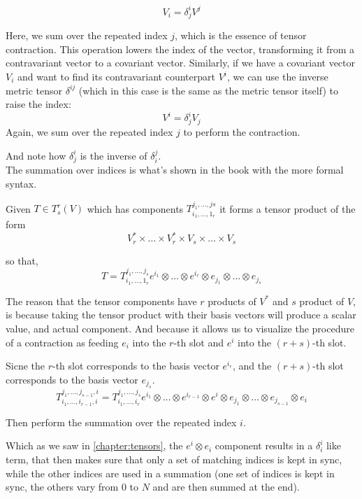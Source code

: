 $$
V_i = \delta^i_j  V^j
$$

Here, we sum over the repeated index $j$, which is the essence of tensor contraction.
This operation lowers the index of the vector, transforming it from a contravariant vector
to a covariant vector.
Similarly, if we have a covariant vector $V_i$ and want to find its contravariant counterpart $V^i$,
we can use the inverse metric tensor $\delta^{ij}$
(which in this case is the same as the metric tensor itself) to raise the index:
$$
V^i = \delta_j^i V_j
$$
Again, we sum over the repeated index $j$ to perform the contraction.

And note how $\delta_j^i$ is the inverse of $\delta^j_i$.
\\


The summation over indices is what's shown in the book with the more formal syntax.

Given $T \in T_{s}^{r} (V)$ which has components $T_{i_1, \dots , 1_r }^{j_1 , \dots , js}$
it forms a tensor product of the form
$$ 
V^{*}_{r} \times \dots \times V^{*}_{r} \times V_s \times \dots \times V_s
$$

so that,
$$
T = T_{i_1, \dots , 1_r }^{j_1 , \dots , j_s} e^{i_1} \otimes \dots \otimes e^{i_r} \otimes e_{j_1} \otimes \dots \otimes e_{j_s}
$$

The reason that the tensor components have $r$ products of $V^*$ and $s$ product of $V$, is because
taking the tensor product with their basis vectors will produce a scalar value, and actual component.
And because it allows us to visualize the procedure of a contraction as feeding $e_i$
into the $r$-th slot and $e^i$ into the $(r+s)$-th slot.

Sicne the $r$-th slot corresponds to the basis vector $e^{i_r}$, and the $(r+s)$-th slot corresponds
to the basis vector $e_{j_s}$.
$$
T_{i_1, \dots, i_{r-1}, i}^{j_1, \dots, j_{s-1}, i} =
T_{i_1, \dots, i_r}^{j_1, \dots, j_s} e^{i_1} \otimes \dots \otimes e^{i_{r-1}} \otimes e^i \otimes e_{j_1} \otimes \dots \otimes e_{j_{s-1}} \otimes e_i
$$

Then perform the summation over the repeated index $i$.

Which as we saw in \ref{chapter:tensors}, the $e^i \otimes e_i$ component results in a $\delta^{i}_{i}$
like term, that then makes sure that only a set of matching indices is kept in sync, while
the other indices are used in a summation (one set of indices is kept in sync, the others vary from
0 to $N$ and are then summed at the end).